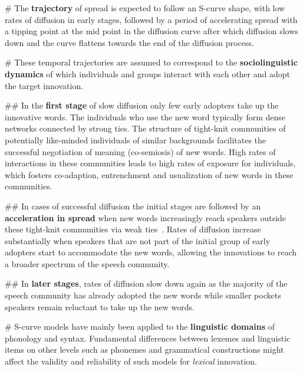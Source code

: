 \documentclass[
  a4paper,
  abstract=on,
  captions=tableabove
  ]{scrartcl}
\renewcommand{\hw}[1]{\textbf{#1}}
\begin{document}
  \begin{easylist}[itemize]

  # The \hw{trajectory} of spread is expected to follow an S-curve shape, with low rates of diffusion in early stages, followed by a period of accelerating spread with a tipping point at the mid point in the diffusion curve after which diffusion slows down and the curve flattens towards the end of the diffusion process.

  # These temporal trajectories are assumed to correspond to the \hw{sociolinguistic dynamics} of which individuals and groups interact with each other and adopt the target innovation.

  ## In the \hw{first stage} of slow diffusion only few early adopters take up the innovative words. The individuals who use the new word typically form dense networks connected by strong ties. The structure of tight-knit communities of potentially like-minded individuals of similar backgrounds facilitates the successful negotiation of meaning (co-semiosis) of new words. High rates of interactions in these communities leads to high rates of exposure for individuals, which fosters co-adaption, entrenchment and usualization of new words in these communities.

  ## In cases of successful diffusion the initial stages are followed by an \hw{acceleration in spread} when new words increasingly reach speakers outside these tight-knit communities via weak ties~\parencite{Granovetter1977StrengthWeak}. Rates of diffusion increase substantially when speakers that are not part of the initial group of early adopters start to accommodate the new words, allowing the innovations to reach a broader spectrum of the speech community.

  ## In \hw{later stages}, rates of diffusion slow down again as the majority of the speech community has already adopted the new words while smaller pockets speakers remain reluctant to take up the new words.

  # S-curve models have mainly been applied to the \hw{linguistic domains} of phonology and syntax. Fundamental differences between lexemes and linguistic items on other levels such as phonemes and grammatical constructions might affect the validity and reliability of such models for \emph{lexical} innovation.


\end{easylist}
\end{document}
